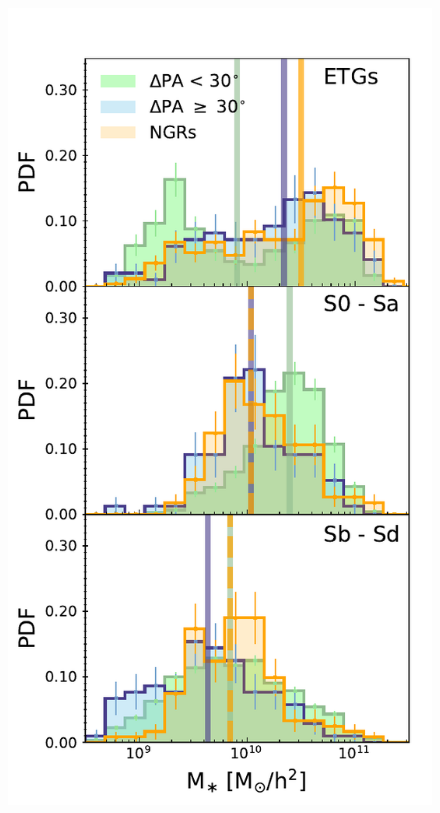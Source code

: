 \documentclass[fleqn,usenatbib]{mnras}
\newcommand{\red}[1]{{\textcolor{red}{#1}}}
\begin{document}

\begin{figure}
	\includegraphics[width=\linewidth]{morph/delPA_stelM_morph_nsa.pdf}

\end{figure}
\end{document}
